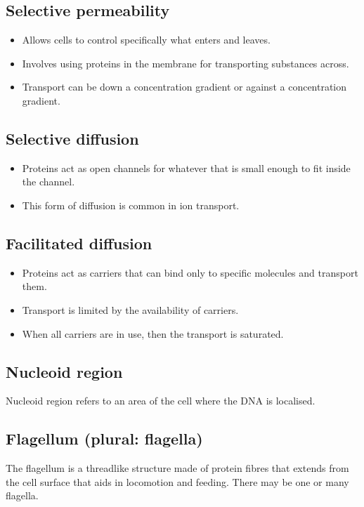 \documentclass[11pt]{article}
\begin{document}
\newpage
\subsection{Selective permeability}
\label{sec:org083b2af}
\begin{itemize}
\item Allows cells to control specifically what enters and leaves.
\item Involves using proteins in the membrane for transporting substances across.
\item Transport can be down a concentration gradient or against a concentration gradient.
\end{itemize}
\subsection{Selective diffusion}
\label{sec:org37ced5f}
\begin{itemize}
\item Proteins act as open channels for whatever that is small enough to fit inside the channel.
\item This form of diffusion is common in ion transport.
\end{itemize}
\subsection{Facilitated diffusion}
\label{sec:org9ffccb0}
\begin{itemize}
\item Proteins act as carriers that can bind only to specific molecules and transport them.
\item Transport is limited by the availability of carriers.
\item When all carriers are in use, then the transport is saturated.
\end{itemize}
\subsection{Nucleoid region}
\label{sec:orgc515ae9}
Nucleoid region refers to an area of the cell where the DNA is localised.
\subsection{Flagellum (plural: flagella)}
\label{sec:org41c3fca}
The flagellum is a threadlike structure made of protein fibres that extends from the cell surface that aids in locomotion and feeding. There may be one or many flagella.
\end{document}
